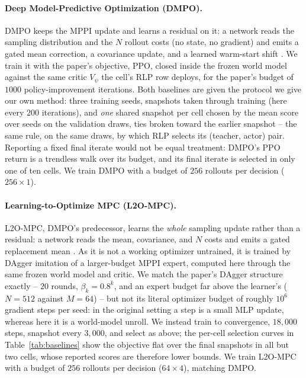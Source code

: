 
\paragraph{Deep Model-Predictive Optimization (DMPO).}
DMPO keeps the MPPI update and learns a residual on it: a network reads the sampling
distribution and the $N$ rollout costs (no state, no gradient) and emits a gated mean
correction, a covariance update, and a learned warm-start shift \citep{sacks2024deep}.
We train it with the paper's objective, PPO, closed inside the frozen world model
against the same critic $V_\psi$ the cell's RLP row deploys, for the paper's budget of
$1000$ policy-improvement iterations. Both baselines are given the protocol we give our
own method: three training seeds, snapshots taken through training (here every $200$
iterations), and \emph{one} shared snapshot per cell chosen by the mean score over seeds
on the validation draws, ties broken toward the earlier snapshot -- the same rule, on the
same draws, by which RLP selects its (teacher, actor) pair. Reporting a fixed final
iterate would not be equal treatment: DMPO's PPO return is a trendless walk over its
budget, and its final iterate is selected in only one of ten cells. We train DMPO with a
budget of $256$ rollouts per decision ($256{\times}1$).

\paragraph{Learning-to-Optimize MPC (L2O-MPC).}
L2O-MPC, DMPO's predecessor, learns the \emph{whole} sampling update rather than a
residual: a network reads the mean, covariance, and $N$ costs and emits a gated
replacement mean \citep{sacks2022learning}. As it is not a working optimizer untrained,
it is trained by DAgger imitation of a larger-budget MPPI expert, computed here through
the same frozen world model and critic. We match the paper's DAgger structure exactly --
$20$ rounds, $\beta_k = 0.8^k$, and an expert budget far above the learner's ($N{=}512$
against $M{=}64$) -- but not its literal optimizer budget of roughly $10^6$ gradient
steps per seed: in the original setting a step is a small MLP update, whereas here it is
a world-model unroll. We instead train to convergence, $18{,}000$ steps, snapshot every
$3{,}000$, and select as above; the per-cell selection curves in
Table~\ref{tab:baselines} show the objective flat over the final snapshots in all but two
cells, whose reported scores are therefore lower bounds. We train L2O-MPC with a budget
of $256$ rollouts per decision ($64{\times}4$), matching DMPO.
